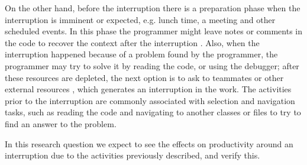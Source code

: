 \documentclass[times]{smrauth}
\newcommand\RR[1]{\textbf{Romain #1}}
\begin{document}
On the other hand, before the interruption there is a preparation phase when the interruption is imminent or expected, e.g. lunch time, a meeting and other scheduled events. In this phase the programmer might leave notes or comments in the code to recover the context after the interruption \cite{PD10}. Also, when the interruption happened because of a problem found by the programmer, the programmer may try to solve it by reading the code, or using the debugger;%
after these resources are depleted, the next option is to ask to teammates or other external resources \cite{LVD06}, which generates an interruption in the work. The activities prior to the interruption are commonly associated with selection and navigation tasks, such as reading the code and navigating to another classes or files to try to find an answer to the problem. 

In this research question we expect to see the effects on productivity around an interruption due to the activities previously described, and verify this.




\end{document}
